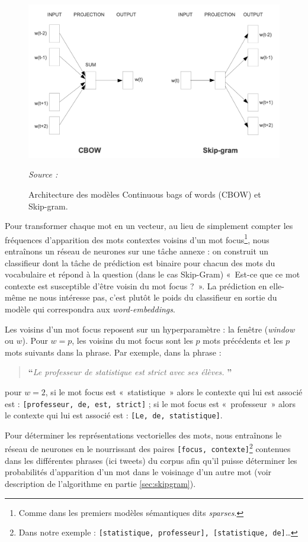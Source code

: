 \documentclass[11pt,french,french]{article}
\let\rmarkdownfootnote\footnote%
\def\footnote{\protect\rmarkdownfootnote}
\begin{document}
\begin{figure}[htp]
\centering
\includegraphics[width=.6\textwidth]{img/cbow_skip_gram.png}
\captionsetup{margin=0cm,format=hang,justification=justified}
\caption{Architecture des modèles Continuous bags of words (CBOW) et Skip-gram.}\label{fig:cbowskipgram}
\footnotesize
\emph{Source : \cite{Mikolov}}
\end{figure}

Pour transformer chaque mot en un vecteur, au lieu de simplement compter
les fréquences d'apparition des mots contextes voisins d'un mot
focus\footnote{Comme dans les premiers modèles sémantiques dits
  \emph{sparses}.}, nous entraînons un réseau de neurones sur une tâche
annexe : on construit un classifieur dont la tâche de prédiction est
binaire pour chacun des mots du vocabulaire et répond à la question
(dans le cas Skip-Gram) «~Est-ce que ce mot contexte est susceptible
d'être voisin du mot focus ?~». La prédiction en elle-même ne nous
intéresse pas, c'est plutôt le poids du classifieur en sortie du modèle
qui correspondra aux \emph{word-embeddings}.

Les voisins d'un mot focus reposent sur un hyperparamètre : la fenêtre
(\emph{window} ou \(w\)). Pour \(w = p\), les voisins du mot focus sont
les \(p\) mots précédents et les \(p\) mots suivants dans la phrase. Par
exemple, dans la phrase :

\begin{quote}
\LARGE \textbf{``}\normalsize \emph{Le professeur de statistique est strict avec ses élèves.} \LARGE \textbf{''}\normalsize
\end{quote}

pour \(w=2\), si le mot focus est «~statistique~» alors le contexte qui
lui est associé est : \texttt{{[}professeur,\ de,\ est,\ strict{]}} ; si
le mot focus est «~professeur~» alors le contexte qui lui est associé
est : \texttt{{[}Le,\ de,\ statistique{]}}.

Pour déterminer les représentations vectorielles des mots, nous
entraînons le réseau de neurones en le nourrissant des paires
\texttt{{[}focus,\ contexte{]}}\footnote{Dans notre exemple :
  \texttt{{[}statistique,\ professeur{]},\ {[}statistique,\ de{]}}\dots}
contenues dans les différentes phrases (ici tweets) du corpus afin qu'il
puisse déterminer les probabilités d'apparition d'un mot dans le
voisinage d'un autre mot (voir description de l'algorithme en partie
\ref{sec:skipgram}).
\end{document}
